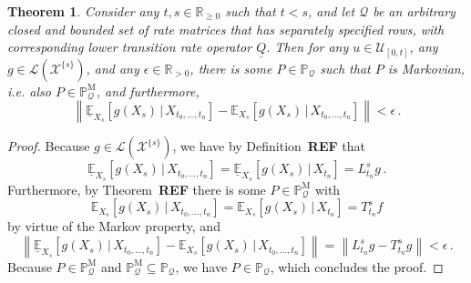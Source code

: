 \documentclass[10pt]{paper}
\newtheorem{theorem}{Theorem}
\newcommand{\reals}{\mathbb{R}}
\newcommand{\realspos}{\reals_{>0}}
\newcommand{\realsnonneg}{\reals_{\geq 0}}
\newcommand{\states}{\mathcal{X}}
\newcommand{\processes}{\mathbb{P}}
\newcommand{\mprocesses}{\processes^{\mathrm{M}}}
\newcommand{\gambles}{\mathcal{L}}
\newcommand{\rateset}{\mathcal{Q}}
\newcommand{\lrate}{\underline{Q}}
\newcommand{\norm}[1]{\left\lVert #1 \right\rVert}
\begin{document}
\begin{theorem}
Consider any $t,s\in\realsnonneg$ such that $t<s$, and let $\rateset$ be an arbitrary closed and bounded set of rate matrices that has separately specified rows, with corresponding lower transition rate operator $\lrate$. Then for any $u\in\mathcal{U}_{[0,t]}$, any $g\in\gambles(\states^{\{s\}})$, and any $\epsilon\in\realspos$, there is some $P\in\processes_\rateset$ such that $P$ is Markovian, i.e. also $P\in\mprocesses_\rateset$, and furthermore,
\begin{equation*}
\norm{\underline{\mathbb{E}}_{X_s}[g(X_s)\,\vert\,X_{t_0,\ldots,t_n}] - \mathbb{E}_{X_s}[g(X_s)\,\vert\,X_{t_0,\ldots,t_n}]} < \epsilon\,.
\end{equation*}
\end{theorem}
\begin{proof}
Because $g\in\gambles(\states^{\{s\}})$, we have by Definition~{\bf REF} that
\begin{equation*}
\underline{\mathbb{E}}_{X_s}[g(X_s)\,\vert\,X_{t_0,\ldots,t_n}] = \underline{\mathbb{E}}_{X_s}[g(X_s)\,\vert\,X_{t_n}] = L_{t_n}^s g\,.
\end{equation*}
Furthermore, by Theorem~{\bf REF} there is some $P\in\mprocesses_\rateset$ with
\begin{equation*}
\mathbb{E}_{X_{s}}[g(X_s)\,\vert\,X_{t_0,\ldots,t_n}] =  \mathbb{E}_{X_{s}}[g(X_s)\,\vert\,X_{t_n}] = T_{t_n}^sf
\end{equation*}
by virtue of the Markov property, and
\begin{equation*}
\norm{\underline{\mathbb{E}}_{X_s}[g(X_s)\,\vert\,X_{t_0,\ldots,t_n}] - \mathbb{E}_{X_{s}}[g(X_s)\,\vert\,X_{t_0,\ldots,t_n}]} = \norm{L_{t_n}^sg - T_{t_n}^sg}< \epsilon\,.
\end{equation*}
Because $P\in\mprocesses_\rateset$ and $\mprocesses_\rateset\subseteq\processes_\rateset$, we have $P\in\processes_\rateset$, which concludes the proof.
\end{proof}
\end{document}
